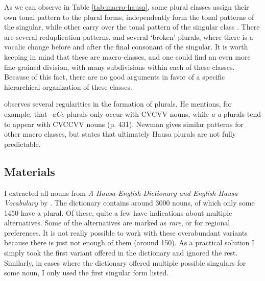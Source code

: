 As we can observe in Table \ref{tab:macro-hausa}, some plural classes assign their own tonal pattern to the plural forms, independently form the tonal patterns of the singular, while other carry over the tonal pattern of the singular class \autocite[p. 430]{Newman.2000}. There are several reduplication patterns, and several `broken' plurals, where there is a vocalic change before and after the final consonant of the singular. It is worth keeping in mind that these are macro-classes, and one could find an even more fine-grained division, with many subdivisions within each of these classes. Because of this fact, there are no good arguments in favor of a specific hierarchical organization of these classes.

\textcite[chapter 56]{Newman.2000} observes several regularities in the formation of plurals. He mentions, for example, that \textit{-aCe} plurals only occur with CVCVV nouns, while \textit{a-a} plurals tend to appear with CVCCVV nouns (p. 431). Newman gives similar patterns for other macro classes, but states that ultimately Hausa plurals are not fully predictable.

\subsection{Materials}

I extracted all nouns from \textit{A Hausa-English Dictionary and English-Hausa Vocabulary} by \textcite{Bargery.1951}. The dictionary contains around 3000 nouns, of which only some 1450 have a plural. Of these, quite a few have indications about multiple alternatives. Some of the alternatives are marked as \textit{rare}, or for regional preferences. It is not really possible to work with these overabundant variants \autocites{Migeod.1914, Salim.1981, Newman.2000} because there is just not enough of them (around 150). As a practical solution I simply took the first variant offered in the dictionary and ignored the rest.
Similarly, in cases where the dictionary offered multiple possible singulars for some noun, I only used the first singular form listed.

